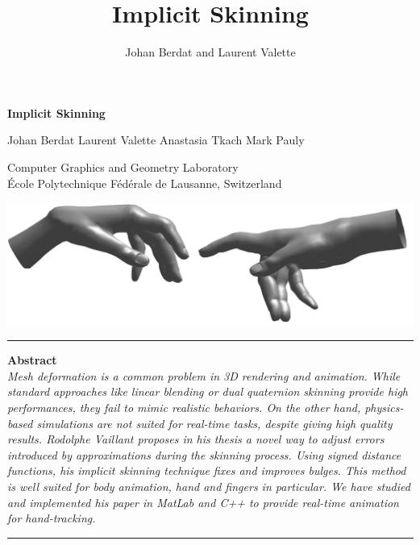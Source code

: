\documentclass[a4paper,10pt]{article}
\begin{document}
\title{Implicit Skinning}
\author{Johan Berdat and Laurent Valette}

\begin{center}
{\huge\bfseries Implicit Skinning}
\end{center}
\vspace{10pt}

\begin{center}
Johan Berdat \hspace{0.2in} Laurent Valette \hspace{0.2in} Anastasia Tkach \hspace{0.2in} Mark Pauly
\vspace{5pt}

{\small Computer Graphics and Geometry Laboratory\\
École Polytechnique Fédérale de Lausanne, Switzerland}
\end{center}
\vspace{10pt}

\begin{center}
\includegraphics[width=\textwidth]{figs/title}
\end{center}

\rule{\linewidth}{0.4pt}
\begin{center}
\begin{minipage}{0.9\linewidth}
\textbf{Abstract} \\
\emph{%
  Mesh deformation is a common problem in 3D rendering and animation.
  While standard approaches like linear blending or dual quaternion skinning provide high performances, they fail to mimic realistic behaviors.
  On the other hand, physics-based simulations are not suited for real-time tasks, despite giving high quality results.
  Rodolphe Vaillant proposes in his thesis a novel way to adjust errors introduced by approximations during the skinning process.
  Using signed distance functions, his implicit skinning technique fixes and improves bulges.
  This method is well suited for body animation, hand and fingers in particular.
  We have studied and implemented his paper in MatLab and C++ to provide real-time animation for hand-tracking.
}
\end{minipage}
\end{center}
\rule{\linewidth}{0.4pt}
\end{document}

